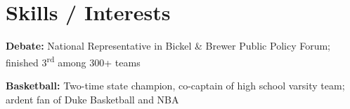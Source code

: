 \documentclass[11pt,letterpaper]{article}
\begin{document}
\section*{Skills / Interests}
\textbf{Debate:} National Representative in Bickel \& Brewer Public Policy Forum; finished 3\textsuperscript{rd} among 300+ teams\par
{\rightskip=-0.3in \textbf{Basketball:} Two-time state champion, co-captain of high school varsity team; ardent fan of Duke Basketball and NBA\par}
\end{document}
